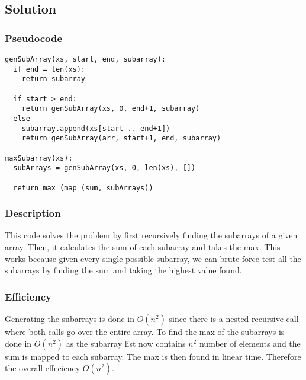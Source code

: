 \subsection*{Solution}

\subsubsection*{Pseudocode}
\begin{verbatim}
genSubArray(xs, start, end, subarray):
  if end = len(xs):
    return subarray

  if start > end:
    return genSubArray(xs, 0, end+1, subarray)
  else
    subarray.append(xs[start .. end+1])
    return genSubArray(arr, start+1, end, subarray)

maxSubarray(xs):
  subArrays = genSubArray(xs, 0, len(xs), [])

  return max (map (sum, subArrays))
\end{verbatim}

\subsubsection*{Description}
This code solves the problem by first recursively finding the subarrays of a given array. Then, it calculates the sum of each subarray and takes the max. This works because given every single possible subarray, we can brute force test all the subarrays by finding the sum and taking the highest value found.

\subsubsection*{Efficiency}
Generating the subarrays is done in $O(n^2)$ since there is a nested recursive call where both calls go over the entire array. To find the max of the subarrays is done in $O(n^2)$ as the subarray list now contains $n^2$ number of elements and the sum is mapped to each subarray. The max is then found in linear time. Therefore the overall effeciency $O(n^2)$.
